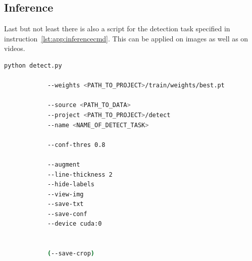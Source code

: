 \subsection{Inference}\label{subsec:app:inference}

Last but not least there is also a script for the detection task specified in 
instruction~\ref{lst:app:inferencecmd}. This can be applied on images as well as on videos.


\begin{minipage}{\linewidth}
	\vspace*{0.5cm}
	\begin{lstlisting}[language=Bash, keywordstyle=\color{black}, 
		caption=General command to start the detection with YOLOv5., label=lst:app:inferencecmd]
		python detect.py
		
			--weights <PATH_TO_PROJECT>/train/weights/best.pt
			
			--source <PATH_TO_DATA>
			--project <PATH_TO_PROJECT>/detect
			--name <NAME_OF_DETECT_TASK>
			
			--conf-thres 0.8
			
			--augment
			--line-thickness 2
			--hide-labels
			--view-img
			--save-txt
			--save-conf
			--device cuda:0
			
			
			(--save-crop)
	\end{lstlisting}
\end{minipage}
